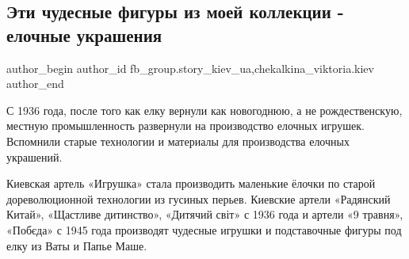  
 
 
 
 
 
\subsection{Эти чудесные фигуры из моей коллекции - елочные украшения}
\label{sec:31_12_2021.fb.fb_group.story_kiev_ua.1.jolka_ukrashenia}
 
\ifcmt
 author_begin
   author_id fb_group.story_kiev_ua,chekalkina_viktoria.kiev
 author_end
\fi

С 1936 года, после того как елку вернули как новогоднюю, а не рождественскую,
местную промышленность развернули на производство елочных игрушек. Вспомнили
старые технологии и материалы для производства елочных украшений. 

\raggedcolumns
\begin{multicols}{3} %
\setlength{\parindent}{0pt}



\end{multicols} %


\raggedcolumns
\begin{multicols}{3} %
\setlength{\parindent}{0pt}


\end{multicols} %

Киевская артель «Игрушка» стала производить маленькие ёлочки по старой
дореволюционной технологии из гусиных перьев. Киевские артели «Радянский
Китай», «Щастливе дитинство», «Дитячий світ» с 1936 года и артели «9 травня»,
«Побєда» с 1945 года производят чудесные игрушки и подставочные фигуры под елку
из Ваты и Папье Маше.  

